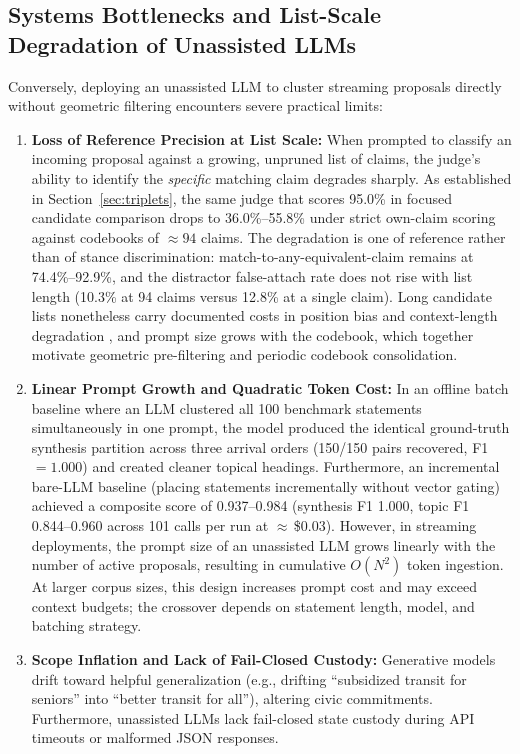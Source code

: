 \documentclass[11pt,a4paper]{article}
\begin{document}
\subsection{Systems Bottlenecks and List-Scale Degradation of Unassisted LLMs}
\label{sec:llmfail}

Conversely, deploying an unassisted LLM to cluster streaming proposals directly without geometric filtering encounters severe practical limits:

\begin{enumerate}
\item \textbf{Loss of Reference Precision at List Scale:} When prompted to classify an incoming proposal against a growing, unpruned list of claims, the judge's ability to identify the \emph{specific} matching claim degrades sharply. As established in Section~\ref{sec:triplets}, the same judge that scores 95.0\% in focused candidate comparison drops to 36.0\%--55.8\% under strict own-claim scoring against codebooks of $\approx 94$ claims. The degradation is one of reference rather than of stance discrimination: match-to-any-equivalent-claim remains at 74.4\%--92.9\%, and the distractor false-attach rate does not rise with list length (10.3\% at 94 claims versus 12.8\% at a single claim). Long candidate lists nonetheless carry documented costs in position bias and context-length degradation \citep{liu2024lost}, and prompt size grows with the codebook, which together motivate geometric pre-filtering and periodic codebook consolidation.

\item \textbf{Linear Prompt Growth and Quadratic Token Cost:} In an offline batch baseline where an LLM clustered all 100 benchmark statements simultaneously in one prompt, the model produced the identical ground-truth synthesis partition across three arrival orders (150/150 pairs recovered, F1 $=1.000$) and created cleaner topical headings. Furthermore, an incremental bare-LLM baseline (placing statements incrementally without vector gating) achieved a composite score of 0.937--0.984 (synthesis F1 1.000, topic F1 0.844--0.960 across 101 calls per run at $\approx$\,\$0.03). However, in streaming deployments, the prompt size of an unassisted LLM grows linearly with the number of active proposals, resulting in cumulative $O(N^2)$ token ingestion. At larger corpus sizes, this design increases prompt cost and may exceed context budgets; the crossover depends on statement length, model, and batching strategy.

\item \textbf{Scope Inflation and Lack of Fail-Closed Custody:} Generative models drift toward helpful generalization (e.g., drifting ``subsidized transit for seniors'' into ``better transit for all''), altering civic commitments. Furthermore, unassisted LLMs lack fail-closed state custody during API timeouts or malformed JSON responses.
\end{enumerate}
\end{document}
